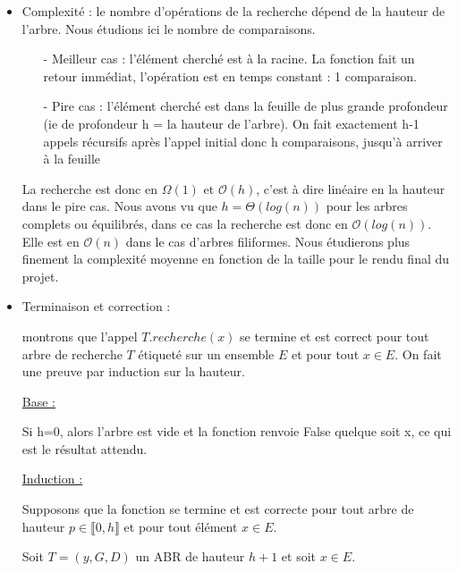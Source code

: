 \documentclass{report}
\begin{document}
\begin{itemize}
    \item Complexité : le nombre d’opérations de la recherche dépend de la hauteur de l’arbre. Nous étudions ici le nombre de comparaisons.
    \begin{itemize}
	\item[-] Meilleur cas : l'élément cherché est à la racine. La fonction fait un retour immédiat, l'opération est en temps constant : 1 comparaison.
	
	\item[-] Pire cas : l'élément cherché est dans la feuille de plus grande profondeur (ie de profondeur h = la hauteur de l'arbre). On fait exactement h-1 appels récursifs après l'appel initial donc h comparaisons, jusqu'à arriver à la feuille
    \end{itemize}
    La recherche est donc en $\Omega(1)$ et $\mathcal{O}(h)$, c'est à dire linéaire en la hauteur dans le pire cas. Nous avons vu que $h = \Theta(log(n))$ pour les arbres complets ou équilibrés, dans ce cas la recherche est donc en $\mathcal{O}(log(n))$. Elle est en $\mathcal{O}(n)$ dans le cas d'arbres filiformes. Nous étudierons plus finement la complexité moyenne en fonction de la taille pour le rendu final du projet.


\item Terminaison et correction :

montrons que l'appel $T.recherche(x)$ se termine et est correct pour tout arbre de recherche $T$ étiqueté sur un ensemble $E$ et pour tout $x \in E$. On fait une preuve par induction sur la hauteur. 
    \begin{flushleft}
    \underline{Base :}
    \end{flushleft}
    Si h=0, alors l'arbre est vide et la fonction renvoie False quelque soit x, ce qui est le résultat attendu.
    
    \begin{flushleft}
    \underline{Induction :}
    \end{flushleft}
    
    Supposons que la fonction se termine et est correcte pour tout arbre de hauteur $p \in {\llbracket 0, h \rrbracket}$ et pour tout élément $x \in E$.
    
    Soit $T = (y,G,D)$ un ABR de hauteur $h+1$ et soit $x \in E$.
    

\end{itemize}
\end{document}
